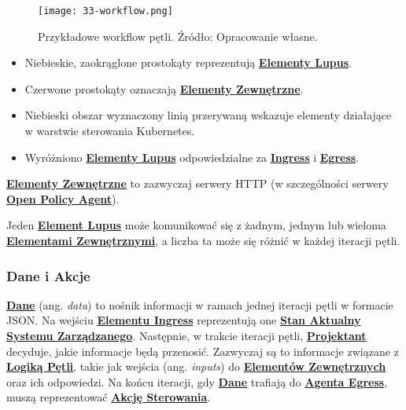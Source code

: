 \begin{figure}[!h]
    \centering \texttt{[image: 33-workflow.png]}
    \caption{Przykładowe workflow pętli. Źródło: Opracowanie własne.}\label{fig:33-workflow}
\end{figure}

\begin{itemize}
    \item Niebieskie, zaokrąglone prostokąty reprezentują \hyperlink{def:element-lupus}{\textbf{Elementy Lupus}}.
    \item Czerwone prostokąty oznaczają \hyperlink{def:element-zewnetrzny}{\textbf{Elementy Zewnętrzne}}.
    \item Niebieski obszar wyznaczony linią przerywaną wskazuje elementy działające w warstwie sterowania Kubernetes. 
    \item Wyróżniono \hyperlink{def:element-lupus}{\textbf{Elementy Lupus}} odpowiedzialne za \hyperlink{def:interfejs-lupin}{\textbf{Ingress}} i \hyperlink{def:interfejs-lupout}{\textbf{Egress}}.
\end{itemize}

\hyperlink{def:element-zewnetrzny}{\textbf{Elementy Zewnętrzne}} to zazwyczaj serwery HTTP (w szczególności serwery \hyperlink{def:opa}{\textbf{Open Policy Agent}}).

Jeden \hyperlink{def:element-lupus}{\textbf{Element Lupus}} może komunikować się z żadnym, jednym lub wieloma \hyperlink{def:element-zewnetrzny}{\textbf{Elementami Zewnętrznymi}}, a liczba ta może się różnić w każdej iteracji pętli.

\subsubsection{Dane i Akcje}

\hyperlink{def:dane}{\textbf{Dane}} (ang. \textit{data}) to nośnik informacji w ramach jednej iteracji pętli w formacie JSON. Na wejściu \hyperlink{def:element-ingres}{\textbf{Elementu Ingress}} reprezentują one \hyperlink{def:stan-aktualny}{\textbf{Stan Aktualny}} \hyperlink{def:system-zarzadzany}{\textbf{Systemu Zarządzanego}}. Następnie, w trakcie iteracji pętli, \hyperlink{def:projektant}{\textbf{Projektant}} decyduje, jakie informacje będą przenosić. Zazwyczaj są to informacje związane z \hyperlink{def:logika-petli}{\textbf{Logiką Pętli}}, takie jak wejścia (ang. \textit{inputs}) do \hyperlink{def:element-zewnetrzny}{\textbf{Elementów Zewnętrznych}} oraz ich odpowiedzi. Na końcu iteracji, gdy \hyperlink{def:dane}{\textbf{Dane}} trafiają do \hyperlink{def:agent-egress}{\textbf{Agenta Egress}}, muszą reprezentować \hyperlink{def:akcja-sterujaca}{\textbf{Akcję Sterowania}}. 

